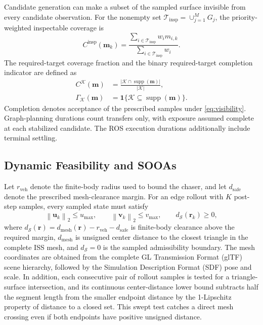 \documentclass{IEEEtaes}
\newcommand{\norm}[1]{\left\lVert #1 \right\rVert}
\begin{document}
Candidate generation can make a subset of the sampled surface invisible from every candidate observation. For the nonempty set $\mathcal T_{\mathrm{insp}}=\cup_{j=1}^{M}G_j$, the priority-weighted inspectable coverage is
\begin{equation}
  C^{\mathrm{insp}}(\mathbf m_k)=
  \frac{\sum_{i\in\mathcal T_{\mathrm{insp}}}w_i m_{i,k}}
  {\sum_{i\in\mathcal T_{\mathrm{insp}}}w_i}.
  \label{eq:inspectable-coverage}
\end{equation}
The required-target coverage fraction and the binary required-target completion indicator are defined as
\begin{equation}
  \begin{aligned}
  C^{\mathcal K}(\mathbf m)&=\frac{|\mathcal K\cap\operatorname{supp}(\mathbf m)|}{|\mathcal K|},\\
  \Gamma_{\mathcal K}(\mathbf m)&=\mathbf1\{\mathcal K\subseteq\operatorname{supp}(\mathbf m)\}.
  \end{aligned}
  \label{eq:required-goal}
\end{equation}
Completion denotes acceptance of the prescribed samples under \eqref{eq:visibility}. Graph-planning durations count transfers only, with exposure assumed complete at each stabilized candidate. The ROS execution durations additionally include terminal settling.

\subsection{Dynamic Feasibility and SOOAs}

Let $r_{\mathrm{veh}}$ denote the finite-body radius used to bound the chaser, and let $d_{\mathrm{safe}}$ denote the prescribed mesh-clearance margin. For an edge rollout with $K$ post-step samples, every sampled state must satisfy
\begin{equation}
  \norm{\mathbf u_k}_2\le u_{\max},\qquad
  \norm{\mathbf v_k}_2\le v_{\max},\qquad
  d_{\mathcal S}(\mathbf r_k)\ge 0,
  \label{eq:limits}
\end{equation}
where $d_{\mathcal S}(\mathbf r)=d_{\mathrm{mesh}}(\mathbf r)-r_{\mathrm{veh}}-d_{\mathrm{safe}}$ is finite-body clearance above the required margin, $d_{\mathrm{mesh}}$ is unsigned center distance to the closest triangle in the complete ISS mesh, and $d_{\mathcal S}=0$ is the sampled admissibility boundary. The mesh coordinates are obtained from the complete GL Transmission Format (glTF) scene hierarchy, followed by the Simulation Description Format (SDF) pose and scale. In addition, each consecutive pair of rollout samples is tested for a triangle-surface intersection, and its continuous center-distance lower bound subtracts half the segment length from the smaller endpoint distance by the 1-Lipschitz property of distance to a closed set. This swept test catches a direct mesh crossing even if both endpoints have positive unsigned distance.
\end{document}
